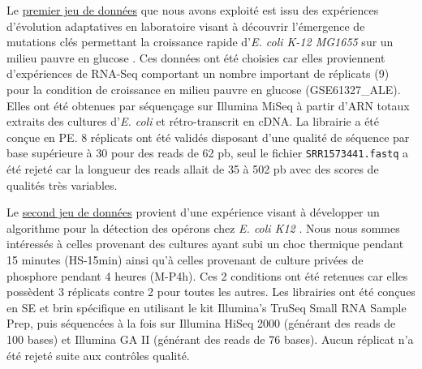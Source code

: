 \documentclass[12pt,a4paper]{report}
\begin{document}
\begin{onehalfspace}
Le \href{http://www.ncbi.nlm.nih.gov/geo/query/acc.cgi?acc=GSE61327}{premier jeu de données} que nous avons exploité est issu des expériences d'évolution adaptatives en laboratoire visant à découvrir l'émergence de mutations clés permettant la croissance rapide d'\textit{E. coli K-12 MG1655} sur un milieu pauvre en glucose \citep{Lacroix2014}. Ces données ont été choisies car elles proviennent d'expériences de RNA-Seq comportant un nombre important de réplicats (9) pour la condition de croissance en milieu pauvre en glucose (GSE61327\_ALE). Elles ont été obtenues par séquençage sur Illumina MiSeq à partir d'ARN totaux extraits des cultures d'\textit{E. coli} et rétro-transcrit en cDNA. La librairie a été conçue en \gls{PE}. 8 réplicats ont été validés disposant d'une qualité de séquence par base supérieure à 30 pour des reads de 62 pb, seul le fichier \texttt{SRR1573441.fastq} a été rejeté car la longueur des reads allait de 35 à 502 pb avec des scores de qualités très variables.

Le \href{http://bioinfolab.uncc.edu/TruHmm_package/raw_data/}{second jeu de données} provient d'une expérience visant à développer un algorithme pour la détection des opérons chez \textit{E. coli K12} \citep{Li2013}. Nous nous sommes intéressés à celles provenant des cultures ayant subi un choc thermique pendant 15 minutes (HS-15min) ainsi qu'à celles provenant de culture privées de phosphore pendant 4 heures (M-P4h). Ces 2 conditions ont été retenues car elles possèdent 3 réplicats contre 2 pour toutes les autres. Les librairies ont été conçues en \gls{SE} et brin spécifique en utilisant le kit Illumina’s TruSeq Small RNA Sample Prep, puis séquencées à la fois sur Illumina HiSeq 2000 (générant des reads de 100 bases) et Illumina GA II (générant des reads de 76 bases). Aucun réplicat n'a été rejeté suite aux contrôles qualité.


\end{onehalfspace}
\end{document}
